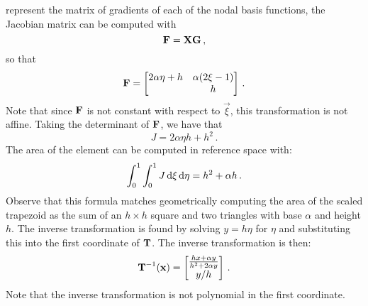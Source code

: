 \documentclass[../doc.tex]{subfiles}
\begin{document}
represent the matrix of gradients of each of the nodal basis functions, the Jacobian matrix can be computed with 
	\begin{equation}
		\boldsymbol{\mathrm{F}} = \boldsymbol{\mathrm{X}} \boldsymbol{\mathrm{G}} \,, 
	\end{equation}
so that 
	\begin{equation}
		\boldsymbol{\mathrm{F}} = \begin{bmatrix} \label{fem:Jacobian_example}
			2 \alpha \eta + h & \alpha(2\xi - 1) \\ 
			& h 
		\end{bmatrix} \,. 
	\end{equation}
Note that since $\boldsymbol{\mathrm{F}}$ is not constant with respect to $\vec{\xi}$, this transformation is not affine. 
Taking the determinant of $\boldsymbol{\mathrm{F}}$, we have that 
	\begin{equation}
		J = 2 \alpha \eta h + h^2 \,. 		
	\end{equation}
The area of the element can be computed in reference space with: 
	\begin{equation}
		\int_0^1 \int_0^1 J \mathop{}\!\mathrm{d} \xi \mathop{}\!\mathrm{d} \eta = h^2 + \alpha h \,. 
	\end{equation}
Observe that this formula matches geometrically computing the area of the scaled trapezoid as the sum of an $h\times h$ square and two triangles with base $\alpha$ and height $h$.  
The inverse transformation is found by solving $y = h\eta$ for $\eta$ and substituting this into the first coordinate of $\boldsymbol{\mathrm{T}}$. The inverse transformation is then: 
	\begin{equation}
		\boldsymbol{\mathrm{T}}^{-1}(\boldsymbol{\mathrm{x}}) = \begin{bmatrix} 
			\frac{h x + \alpha y}{h^2 + 2\alpha y} \\ 
			y/h 
		\end{bmatrix} \,. 
	\end{equation}
Note that the inverse transformation is not polynomial in the first coordinate. 
\end{document}
